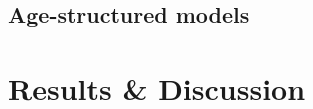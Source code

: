 \documentclass[12pt,letterpaper]{article}
\begin{document}




\subsection*{Age-structured models}

\section*{Results \& Discussion}
\end{document}
